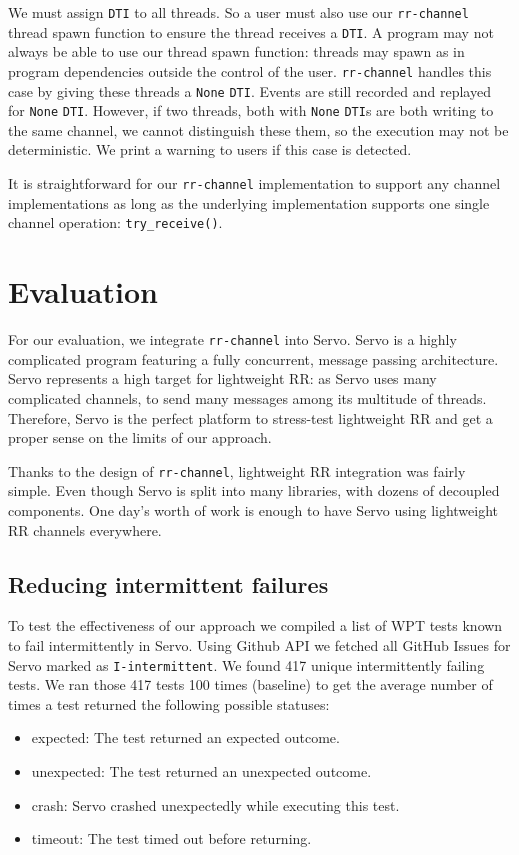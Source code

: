 We must assign \texttt{DTI} to all threads. So a user must also use our
\texttt{rr-channel} thread spawn function to ensure the thread receives a \texttt{DTI}. A
program may not always be able to use our thread spawn function: threads may spawn as in
program dependencies outside the control of the user. \texttt{rr-channel} handles this
case by giving these threads
a \texttt{None} \texttt{DTI}. Events are still recorded and replayed for \texttt{None}
\texttt{DTI}. However, if two threads, both with \texttt{None} \texttt{DTI}s are both
writing to the same channel, we cannot distinguish these them, so the execution may not
be deterministic. We print a warning to users if this case is detected.

It is straightforward for our \texttt{rr-channel} implementation to support
any channel implementations as long as the underlying implementation supports
one single channel operation: \texttt{try\_receive()}.

\section{Evaluation}
For our evaluation, we integrate \texttt{rr-channel} into Servo. Servo is a
highly complicated program featuring a fully concurrent, message passing architecture.
Servo represents a high target for lightweight RR: as Servo uses many complicated channels, to send many messages among its multitude of threads.
Therefore, Servo is the perfect platform to stress-test lightweight RR and get
a proper sense on the limits of our approach.

Thanks to the design of \texttt{rr-channel}, lightweight RR integration was fairly simple.
Even though Servo is split into many libraries, with dozens of decoupled components. One
day's worth of work is enough to have Servo using lightweight RR channels everywhere.

\subsection{Reducing intermittent failures}

To test the effectiveness of our approach we compiled a list of WPT tests known to
fail intermittently in Servo. Using Github API we fetched all GitHub Issues for Servo
marked as \texttt{I-intermittent}. We found 417 unique intermittently failing tests.
We ran those 417 tests 100 times (baseline) to get the average number of times a
test returned the following possible statuses:
\begin{itemize}
  \item expected: The test returned an expected outcome.
  \item unexpected: The test returned an unexpected outcome.
  \item crash: Servo crashed unexpectedly while executing this test.
  \item timeout: The test timed out before returning.
\end{itemize}

